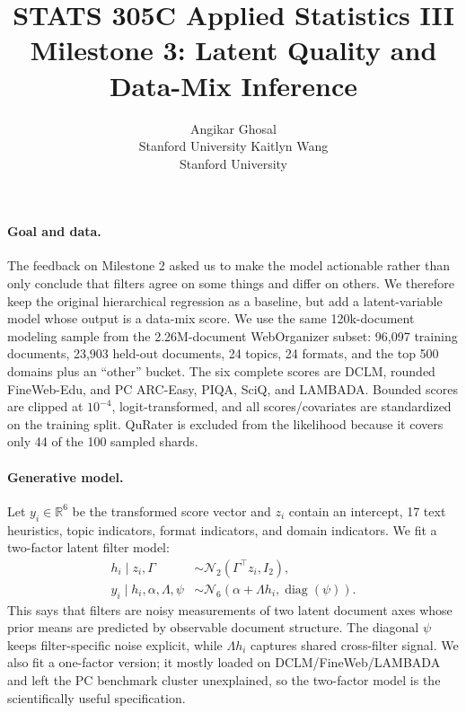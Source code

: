 \documentclass{article}
\title{STATS 305C Applied Statistics III\\Milestone 3: Latent Quality and Data-Mix Inference}
\author{Angikar Ghosal\\Stanford University \And Kaitlyn Wang\\Stanford University}
\date{}
\newcommand{\R}{\mathbb{R}}
\newcommand{\N}{\mathcal{N}}
\begin{document}
\maketitle
\vspace{-1.4em}
\small
\setlength{\parskip}{3pt}

\paragraph{Goal and data.}
The feedback on Milestone 2 asked us to make the model actionable rather than
only conclude that filters agree on some things and differ on others. We
therefore keep the original hierarchical regression as a baseline, but add a
latent-variable model whose output is a data-mix score. We use the same
120k-document modeling sample from the 2.26M-document WebOrganizer subset:
96,097 training documents, 23,903 held-out documents, 24 topics, 24 formats,
and the top 500 domains plus an ``other'' bucket. The six complete scores are
DCLM, rounded FineWeb-Edu, and PC ARC-Easy, PIQA, SciQ, and LAMBADA. Bounded
scores are clipped at $10^{-4}$, logit-transformed, and all scores/covariates
are standardized on the training split. QuRater is excluded from the likelihood
because it covers only 44 of the 100 sampled shards.

\paragraph{Generative model.}
Let $y_i\in\R^6$ be the transformed score vector and $z_i$ contain an
intercept, 17 text heuristics, topic indicators, format indicators, and domain
indicators. We fit a two-factor latent filter model:
\begin{align}
  h_i \mid z_i,\Gamma &\sim \N_2(\Gamma^\top z_i, I_2),\\
  y_i \mid h_i,\alpha,\Lambda,\psi &\sim
    \N_6(\alpha+\Lambda h_i,\operatorname{diag}(\psi)).
\end{align}
This says that filters are noisy measurements of two latent document axes whose
prior means are predicted by observable document structure. The diagonal
$\psi$ keeps filter-specific noise explicit, while $\Lambda h_i$ captures
shared cross-filter signal. We also fit a one-factor version; it mostly loaded
on DCLM/FineWeb/LAMBADA and left the PC benchmark cluster unexplained, so the
two-factor model is the scientifically useful specification.
\end{document}
